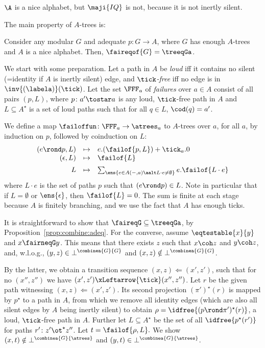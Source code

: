 \documentclass{LMCS}
\renewcommand{\QFI}{\maji{IQ}}
\renewcommand{\LLL}{\QFI}
\theoremstyle{plain}\newtheorem{satz}[thm]{Satz}
\begin{document}
\begin{exa}
  $\A$ is a nice alphabet, but $\LLL$ is not, because it is not
  inertly silent.
\end{exa}

The main property of $A$-trees is:

\begin{prop}\label{prop:failures}
  Consider any modular $G$ and adequate $p \colon G \to A$, where $G$
  has enough $A$-trees and $A$ is a nice alphabet. Then,
  ${\faireqof{G}} = {\treeqGa}$.
\end{prop}

We start with some preparation.  Let a path in $A$ be \emph{loud} iff
it contains no silent (=identity if $A$ is inertly silent) edge, and
\emph{$\tick$-free} iff no edge is in $\inv{(\labela)} (\tick)$.  Let
the set $\FFF_a$ of \emph{failures} over $a \in A$ consist of all
pairs $(p,L)$, where $p \colon a' \tostar a$ is any loud, $\tick$-free
path in $A$ and $L \subseteq A^\star$ is a set of loud paths such that
for all $q \in L$, $\cod(q) = a'$.

  We define a map $\failoffun \colon \FFF_a \to \atrees_a$ to $A$-trees
  over $a$, for all $a$, by induction on $p$, followed by coinduction
  on $L$:
  $$
  \begin{array}[t]{rcll}
      (e \rond p, L) & \mapsto & e.(\failof{p,L}) + \tick_a.0 \\
    (\epsilon, L) & \mapsto & 
\failof{L} 
\\[.5em]
      L & \mapsto & 
\sum_{\ens{e \in A(-,a) \aalt L \cdot e \neq \emptyset}}
        e.\failof{L \cdot e} 
\end{array}
  $$
  where $L \cdot e$ is the set of paths $p$ such that $(e \rond p) \in
  L$.  Note in particular that if $L = \emptyset$ or $\ens{\epsilon}$,
  then $\failof{L} = 0$.  The sum is finite at each stage because $A$
  is finitely branching, and we use the fact that $A$ has enough
  ticks.
  

  It is straightforward to show that ${\faireqG} \subseteq
  {\treeqGa}$, by Proposition~\ref{prop:combine:adeq}. For the
  converse, assume $\eqtestable{x}{y}$ and $x \fairneqG y$.  This
  means that there exists $z$ such that $x \coh z$ and $y \coh z$,
  and, w.l.o.g., $(y,z) \in \bot^{\combinea{G}{G}}$ and $(x,z) \notin
  \bot^{\combinea{G}{G}}$.
  
  By the latter, we obtain a transition sequence $(x,z) \Leftarrow
  (x',z')$, such that for no $(x'',z'')$ we have $(x',z')
  \xLeftarrow{\tick} (x'',z'')$.  Let $r$ be the given path witnessing
  $(x,z) \Leftarrow (x',z')$.  Its second projection $(\pi')^\star(r)$
  is mapped by $p^\star$ to a path in $A$, from which we remove all
  identity edges (which are also all silent edges by $A$ being inertly
  silent) to obtain $\rho = \idfree{(p \rond \pi')^\star(r)}$, a loud,
  $\tick$-free path in $A$.  Further let $L \subseteq A^\star$ be the
  set of all $\idfree{p^\star(r')}$ for paths $r' \colon z' \ot^\star
  z''$.  Let $t = \failof{\rho,L}.$ We show $(x,t) \notin
  \bot^{\combinea{G}{\atrees}}$ and $(y,t) \in
  \bot^{\combinea{G}{\atrees}}$.
\end{document}
